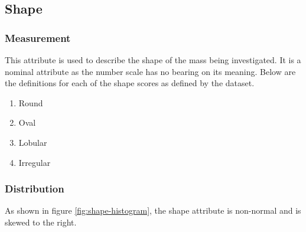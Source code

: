 \documentclass[12pt]{article}
\begin{document}
    \subsection{Shape}
      \subsubsection{Measurement}
        This attribute is used to describe the shape of the mass being investigated. It is a nominal attribute as the number scale has no bearing on its meaning. Below are the definitions for each of the shape scores as defined by the dataset.

        \singlespacing
        \begin{enumerate}[label=\arabic*)]
          \item Round
          \item Oval
          \item Lobular
          \item Irregular
        \end{enumerate}
        \doublespacing

      \subsubsection{Distribution}
        As shown in figure \ref{fig:shape-histogram}, the shape attribute is non-normal and is skewed to the right.
\end{document}
